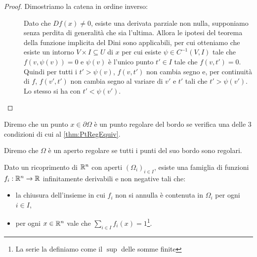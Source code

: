 \begin{proof}
	Dimostriamo la catena in ordine inverso:
	\begin{description}
		\item [] Dato che $Df(x)\neq 0$, esiste una derivata parziale non nulla, supponiamo senza perdita di
			generalità che sia l'ultima. Allora le ipotesi del teorema della funzione implicita del Dini sono applicabili, per cui
			otteniamo che esiste un intorno $V\times I\subseteq U$ di $x$ per cui esiste $\psi\in C^{-1}(V,I)$ tale che $f(v,\psi(v))=0$
			e $\psi(v)$ è l'unico punto $t'\in I$ tale che $f(v,t')=0$. Quindi per tutti i $t'>\psi(v)$, $f(v,t')$ non cambia segno e,
			per continuità di $f$, $f(v',t')$ non cambia segno al variare di $v'$ e $t'$ tali che $t'>\psi(v')$. Lo stesso si ha con 
			$t'<\psi(v')$. 
		\item []
		\item []
	\end{description}

\end{proof}


\begin{definition}
	Diremo che un punto $x\in \partial \Omega$ è un punto regolare del bordo se verifica una delle $3$ condizioni di cui
	al \cref{thm:PtRegEquiv}.
\end{definition}

\begin{definition}
	Diremo che $\Omega$ è un aperto regolare se tutti i punti del suo bordo sono regolari.
\end{definition}

\begin{theorem}\label{thm:PartizioneUnita}
	Dato un ricoprimento di $\mathbb R^n$ con aperti $(\Omega_i)_{i\in I}$, esiste una famiglia di funzioni $f_i:\mathbb R^n\to\mathbb R$ infinitamente derivabili e non negative tali che:
	\begin{itemize}
		\item la chiusura dell'insieme in cui $f_i$ non si annulla è contenuta in $\Omega_i$ per ogni $i\in I$,
		\item per ogni $x\in\mathbb R^n$ vale che $\sum_{i\in I} f_i(x)=1$\footnote{La serie la definiamo come il $\sup$ delle somme finite}.
	\end{itemize}

\end{theorem}
